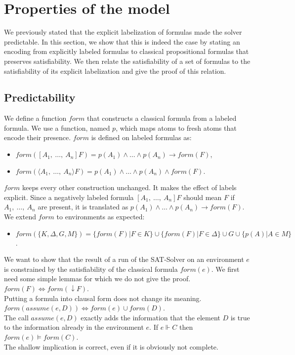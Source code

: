 \documentclass[a4paper,11pt]{article}
\newcommand{\F}{\mathit{form}}
\newcommand{\A}{\mathit{assume}}
\begin{document}
\section{Properties of the model}
We previously stated that the explicit labelization of formulas made the solver predictable.
In this section, we show that this is indeed the case by stating an encoding from
explicitly labeled formulas to classical propositional formulas that preserves satisfiability.
We then relate the satisfiability of a set of formulas to the satisfiability of
its explicit labelization and give the proof of this relation.
\subsection{Predictability}
We define a function $\F$ that constructs a classical formula from a labeled formula. We use
a function, named $p$, which maps atoms to fresh atoms that encode their presence. $\F$ is
defined on labeled formulas as:
\begin{itemize}
 \item $\F([A_1,\ \dots,\ A_n]F)=p(A_1)\wedge\dots\wedge p(A_n)\rightarrow \F(F)$,
 \item $\F(\langle A_1,\ \dots,\ A_n\rangle F)= p(A_1)\wedge\dots\wedge p(A_n)\wedge \F(F)$.
\end{itemize}
$\F$ keeps every other construction unchanged. It makes the effect of labels explicit. Since a
negatively labeled formula $[A_1,\ \dots,\ A_n]F$ should mean $F$ if $A_1,\ \dots,\ A_n$ are
present, it is translated as $p(A_1)\wedge\dots\wedge p(A_n)\rightarrow \F(F)$. We extend
$\F$ to environments as expected:
\begin{itemize}
 \item $\F(\{K,\Delta,G,M\})=\{\F(F)|F\in K\}\cup\{\F(F)|F\in\Delta\}\cup G\cup\{p(A)|A\in M\}$.
\end{itemize}
We want to show that the result of a run of the SAT-Solver on an environment $e$ is constrained by
the satisfiability of the classical formula $\F(e)$. We first need some simple lemmas for which we do
not give the proof.
{\lemma $\F(F)\Leftrightarrow\F(\downarrow F)$.}\\
Putting a formula into clausal form does not change its meaning.
{\lemma $\F(\A(e,D))\Leftrightarrow\F(e)\cup\F(D)$.}\\
The call $\A(e,D)$ exactly adds the information that the element $D$ is true to the information
already in the environment $e$.
{\lemma If $e\Vdash C$ then $\F(e)\vDash\F(C)$.}\\
The shallow implication is correct, even if it is obviously not complete.
\end{document}
